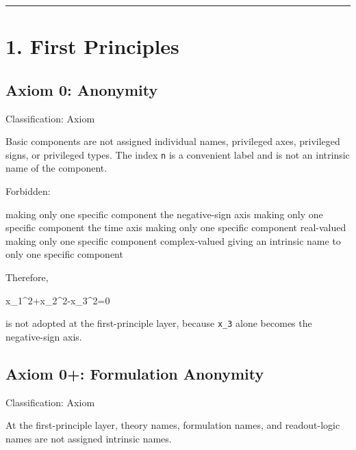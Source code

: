 \documentclass[
  a4paper]{article}
\newenvironment{Shaded}{}{}
\newcommand{\NormalTok}[1]{#1}
\begin{document}
\begin{center}\rule{0.5\linewidth}{0.5pt}\end{center}

\section{1. First Principles}\label{first-principles}

\subsection{Axiom 0: Anonymity}\label{axiom-0-anonymity}

Classification: Axiom

Basic components are not assigned individual names, privileged axes,
privileged signs, or privileged types. The index \texttt{n} is a
convenient label and is not an intrinsic name of the component.

Forbidden:

\begin{Shaded}
\begin{Highlighting}[]
\NormalTok{making only one specific component the negative{-}sign axis}
\NormalTok{making only one specific component the time axis}
\NormalTok{making only one specific component real{-}valued}
\NormalTok{making only one specific component complex{-}valued}
\NormalTok{giving an intrinsic name to only one specific component}
\end{Highlighting}
\end{Shaded}

Therefore,

\begin{Shaded}
\begin{Highlighting}[]
\NormalTok{x\_1\^{}2+x\_2\^{}2{-}x\_3\^{}2=0}
\end{Highlighting}
\end{Shaded}

is not adopted at the first-principle layer, because \texttt{x\_3} alone
becomes the negative-sign axis.

\subsection{Axiom 0+: Formulation
Anonymity}\label{axiom-0-formulation-anonymity}

Classification: Axiom

At the first-principle layer, theory names, formulation names, and
readout-logic names are not assigned intrinsic names.
\end{document}
